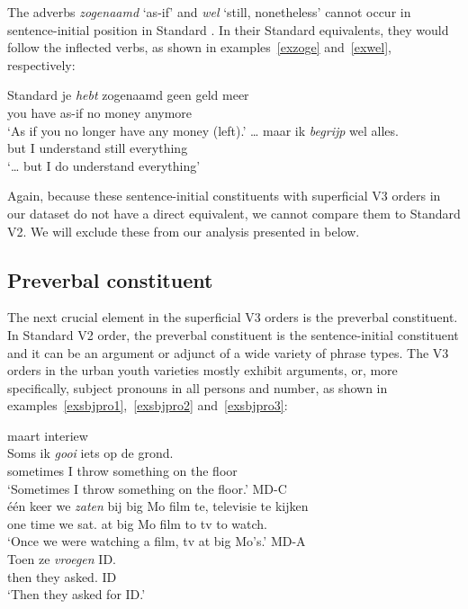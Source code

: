 \documentclass[output=paper]{langsci/langscibook}
\begin{document}
\noindent The adverbs \emph{zogenaamd} `as-if' and \emph{wel} `still,
nonetheless' cannot occur in sen\-tence-initial position in Standard . In
their Standard  equivalents, they would follow the inflected verbs, as
shown in examples~\eqref{exzoge} and~\eqref{exwel}, respectively:

\ea Standard 
    \ea
    \gll\label{exzoge}je \textit{hebt} zogenaamd geen geld meer\\
    you have as-if no money anymore\\
    \trans \enquote*{As if you no longer have any money (left).}
    \ex
    \gll\label{exwel}\dots{} maar ik \textit{begrijp} wel alles.\\
    {} but I understand still everything\\
    \trans \enquote*{\dots{} but I do understand everything}
    \z
\z

\noindent Again, because these sentence-initial constituents with superficial
V3 orders in our dataset do not have a direct equivalent, we cannot compare
them to Standard  V2. We will exclude these from our analysis presented in
 below.

\subsection{Preverbal constituent}
\label{sec:dataprev}

\noindent The next crucial element in the superficial V3 orders is the
preverbal constituent. In Standard  V2 order, the preverbal constituent is
the sentence-initial constituent and it can be an argument or adjunct of a wide
variety of phrase types. The V3 orders in the  urban youth varieties
mostly exhibit arguments, or, more specifically, subject pronouns in all
persons and number, as shown in examples~\eqref{exsbjpro1},~\eqref{exsbjpro2}
and~\eqref{exsbjpro3}:

\ea
     maart interiew\\
    \gll\label{exsbjpro1}Soms ik \textit{gooi} iets op de grond.\\
    sometimes I throw something on the floor\\
    \trans \enquote*{Sometimes I throw something on the floor.}
    \ex MD-C\\
    \gll\label{exsbjpro2}\'e\'en keer we \textit{zaten} bij big Mo film te, televisie te kijken\\
    one time we sat.\Pl{} at big Mo film to tv to watch.\Inf{}\\
    \trans \enquote*{Once we were watching a film, tv at big Mo}s.'
    \ex MD-A\\
    \gll\label{exsbjpro3}Toen ze \textit{vroegen} ID.\\
    then they asked.\Pl{} ID\\
    \trans \enquote*{Then they asked for ID.}
    \z
\z
\end{document}
